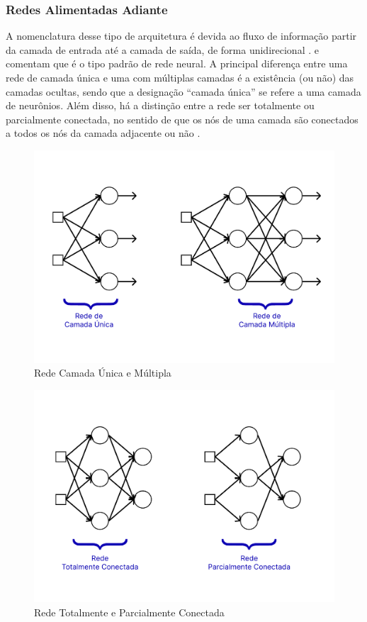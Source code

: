 \documentclass{automatextcc}
\begin{document}
\subsubsection{Redes Alimentadas Adiante}
A nomenclatura desse tipo de arquitetura é devida ao fluxo de informação partir da camada de entrada até a camada de saída, de forma unidirecional \citep{goodfellow2016}. \citet{hastie2008} e \citet{fan2021} comentam que é o tipo padrão de rede neural. A principal diferença entre uma rede de camada única e uma com múltiplas camadas é a existência (ou não) das camadas ocultas, sendo que a designação ``camada única'' se refere a uma camada de neurônios. Além disso, há a distinção entre a rede ser totalmente ou parcialmente conectada, no sentido de que os nós de uma camada são conectados a todos os nós da camada adjacente ou não \citep{haykin2009}. 
\begin{figure}
    \centering
    \includegraphics[width=.7\textwidth]{figuras/network_layers.pdf}
	\caption{Rede Camada Única e Múltipla \citep[adaptado de][]{haykin2009}}
\end{figure}
\begin{figure}
    \centering
    \includegraphics[width=.7\textwidth]{figuras/network_connections.pdf}
	\caption{Rede Totalmente e Parcialmente Conectada \citep[adaptado de][]{haykin2009}}
\end{figure}
\end{document}
